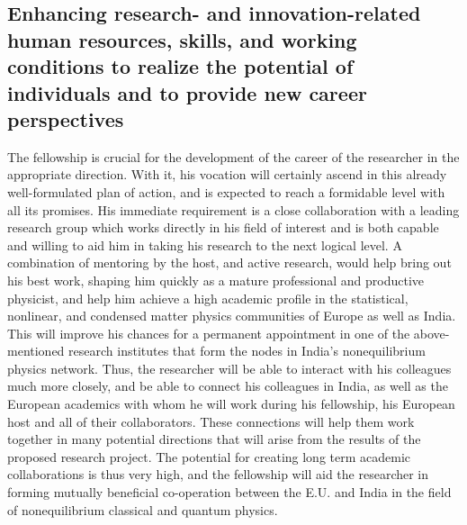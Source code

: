 \documentclass[a4paper,11pt]{article}
\begin{document}
\subsection{Enhancing research- and innovation-related human resources,
  skills, and working conditions to realize the potential of individuals
  and to provide new career perspectives}
\label{sec:impact-fellow}
The fellowship is crucial for the development of the career of the researcher in the appropriate direction. With it, his vocation will certainly ascend in this already well-formulated plan of action, and is expected to  reach a formidable level with all its promises. His immediate requirement is a close collaboration with a leading research group which works directly in his field of interest and is both capable and willing to aid him in taking his research to the next logical level. A combination of mentoring by the host, and active research, would help bring out his best work, shaping him quickly as a mature professional and productive physicist, and help him achieve a high academic profile in the statistical, nonlinear, and condensed matter physics communities of Europe as well as India. This will improve his chances for a permanent appointment in one of the above-mentioned research institutes that form the nodes in India's nonequilibrium physics network. Thus, the researcher will be able to interact with 
his colleagues much more closely, and be able to connect his colleagues in India, as well as the European academics with whom he will work during his fellowship, his European host and all of their collaborators. These connections will help them work together in many potential directions that will arise from the results of the proposed research project. The potential for creating long term academic collaborations is thus very high, and the fellowship will aid the researcher in forming mutually beneficial co-operation between the E.U. and India in the field of nonequilibrium classical and quantum physics.
\end{document}
